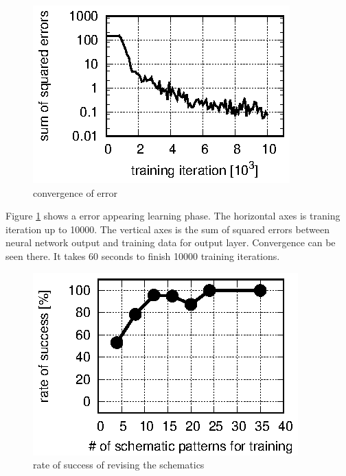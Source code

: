 \documentclass[twocolumn]{article}
\begin{document}
\begin{figure}[!tp]
 \begin{center}
  \begin{minipage}{\hsize}
   \includegraphics[width=\hsize]{fig/errors.eps}
   \caption{convergence of error}
   \label{fig:errors}
  \end{minipage}
 \end{center}
\end{figure}

Figure \ref{fig:errors} shows a error appearing learning phase.
The horizontal axes is traning iteration up to 10000.
The vertical axes is the sum of squared errors between
neural network output and training data for output layer.
Convergence can be seen there.
It takes 60 seconds to finish 10000 training iterations.

\begin{figure}[!tp]
 \begin{center}
  \begin{minipage}{\hsize}
   \includegraphics[width=\hsize]{fig/test_data.eps}
   \caption{rate of success of revising the schematics}
   \label{fig:test_data}
  \end{minipage}
 \end{center}
\end{figure}
\end{document}
